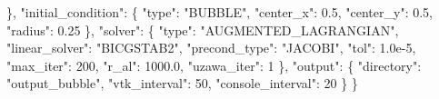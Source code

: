 \documentclass[
  french,
]{article}
\newenvironment{Shaded}{}{}
\newcommand{\DataTypeTok}[1]{\textcolor[rgb]{0.56,0.13,0.00}{#1}}
\newcommand{\DecValTok}[1]{\textcolor[rgb]{0.25,0.63,0.44}{#1}}
\newcommand{\FloatTok}[1]{\textcolor[rgb]{0.25,0.63,0.44}{#1}}
\newcommand{\FunctionTok}[1]{\textcolor[rgb]{0.02,0.16,0.49}{#1}}
\newcommand{\StringTok}[1]{\textcolor[rgb]{0.25,0.44,0.63}{#1}}
\begin{document}
\begin{Shaded}
\begin{Highlighting}[]
  \FunctionTok{\},}
  \DataTypeTok{"initial\_condition"}\FunctionTok{:} \FunctionTok{\{}
    \DataTypeTok{"type"}\FunctionTok{:} \StringTok{"BUBBLE"}\FunctionTok{,}
    \DataTypeTok{"center\_x"}\FunctionTok{:} \FloatTok{0.5}\FunctionTok{,} \DataTypeTok{"center\_y"}\FunctionTok{:} \FloatTok{0.5}\FunctionTok{,} \DataTypeTok{"radius"}\FunctionTok{:} \FloatTok{0.25}
  \FunctionTok{\},}
  \DataTypeTok{"solver"}\FunctionTok{:} \FunctionTok{\{}
    \DataTypeTok{"type"}\FunctionTok{:} \StringTok{"AUGMENTED\_LAGRANGIAN"}\FunctionTok{,}
    \DataTypeTok{"linear\_solver"}\FunctionTok{:} \StringTok{"BICGSTAB2"}\FunctionTok{,}
    \DataTypeTok{"precond\_type"}\FunctionTok{:} \StringTok{"JACOBI"}\FunctionTok{,}
    \DataTypeTok{"tol"}\FunctionTok{:} \FloatTok{1.0e{-}5}\FunctionTok{,} \DataTypeTok{"max\_iter"}\FunctionTok{:} \DecValTok{200}\FunctionTok{,} \DataTypeTok{"r\_al"}\FunctionTok{:} \FloatTok{1000.0}\FunctionTok{,} \DataTypeTok{"uzawa\_iter"}\FunctionTok{:} \DecValTok{1}
  \FunctionTok{\},}
  \DataTypeTok{"output"}\FunctionTok{:} \FunctionTok{\{} \DataTypeTok{"directory"}\FunctionTok{:} \StringTok{"output\_bubble"}\FunctionTok{,} \DataTypeTok{"vtk\_interval"}\FunctionTok{:} \DecValTok{50}\FunctionTok{,} \DataTypeTok{"console\_interval"}\FunctionTok{:} \DecValTok{20} \FunctionTok{\}}
\FunctionTok{\}}
\end{Highlighting}
\end{Shaded}
\end{document}
